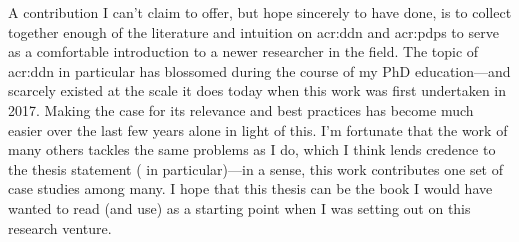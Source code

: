 A contribution I can't claim to offer, but hope sincerely to have done, is to collect together enough of the literature and intuition on \gls{acr:ddn} and \glspl{acr:pdp} to serve as a comfortable introduction to a newer researcher in the field.
The topic of \gls{acr:ddn} in particular has blossomed during the course of my PhD education---and scarcely existed at the scale it does today when this work was first undertaken in 2017.
Making the case for its relevance and best practices has become much easier over the last few years alone in light of this.
I'm fortunate that the work of many others tackles the same problems as I do, which I think lends credence to the thesis statement ( in particular)---in a sense, this work contributes one set of case studies among many.
I hope that this thesis can be the book I would have wanted to read (and use) as a starting point when I was setting out on this research venture.


%

